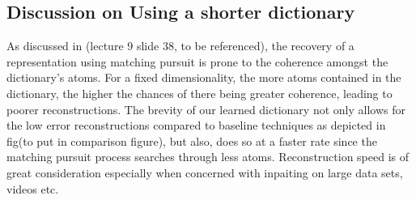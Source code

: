 \subsection {Discussion on Using a shorter dictionary}

As discussed in (lecture 9 slide 38, to be referenced), the recovery of a representation using matching pursuit is prone to the coherence amongst the dictionary's atoms. For a fixed dimensionality, the more atoms contained in the dictionary, the higher the chances of there being greater coherence, leading to poorer reconstructions. The brevity of our learned dictionary not only allows for the low error reconstructions compared to baseline techniques as depicted in fig(to put in comparison figure), but also, does so at a faster rate since the matching pursuit process searches through less atoms. Reconstruction speed is of great consideration especially when concerned with inpaiting on large data sets, videos etc.

